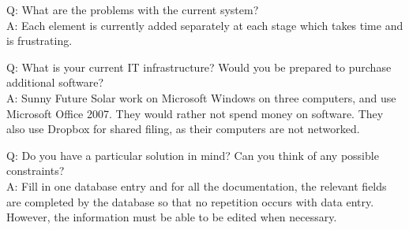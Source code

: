 Q: What are the problems with the current system?\\
A: Each element is currently added separately at each stage which takes time and is frustrating.

Q: What is your current IT infrastructure?  Would you be prepared to purchase additional software?\\
A: Sunny Future Solar work on Microsoft Windows on three computers, and use Microsoft Office 2007.  They would rather not spend money on software.  They also use Dropbox for shared filing, as their computers are not networked.

Q: Do you have a particular solution in mind?  Can you think of any possible constraints?\\
A: Fill in one database entry and for all the documentation, the relevant fields are completed by the database so that no repetition occurs with data entry.  However, the information must be able to be edited when necessary.
